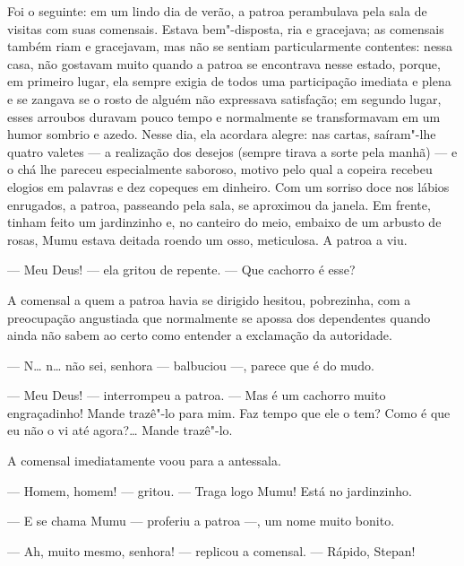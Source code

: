 Foi o seguinte: em um lindo dia de verão, a patroa perambulava pela sala
de visitas com suas comensais. Estava bem"-disposta, ria e gracejava; as
comensais também riam e gracejavam, mas não se sentiam particularmente
contentes: nessa casa, não gostavam muito quando a patroa se encontrava
nesse estado, porque, em primeiro lugar, ela sempre exigia de todos uma
participação imediata e plena e se zangava se o rosto de alguém não
expressava satisfação; em segundo lugar, esses arroubos duravam pouco
tempo e normalmente se transformavam em um humor sombrio e azedo. Nesse
dia, ela acordara alegre: nas cartas, saíram"-lhe quatro valetes --- a
realização dos desejos (sempre tirava a sorte pela manhã) --- e o chá
lhe pareceu especialmente saboroso, motivo pelo qual a copeira recebeu
elogios em palavras e dez copeques em dinheiro. Com um sorriso doce nos
lábios enrugados, a patroa, passeando pela sala, se aproximou da janela.
Em frente, tinham feito um jardinzinho e, no canteiro do meio, embaixo
de um arbusto de rosas, Mumu estava deitada roendo um osso, meticulosa.
A patroa a viu.

--- Meu Deus! --- ela gritou de repente. --- Que cachorro é esse?

A comensal a quem a patroa havia se dirigido hesitou, pobrezinha, com a
preocupação angustiada que normalmente se apossa dos dependentes quando
ainda não sabem ao certo como entender a exclamação da autoridade.

--- N\ldots{} n\ldots{} não sei, senhora --- balbuciou ---, parece que é do mudo.

--- Meu Deus! --- interrompeu a patroa. --- Mas é um cachorro muito
engraçadinho! Mande trazê"-lo para mim. Faz tempo que ele o tem? Como é
que eu não o vi até agora?\ldots{} Mande trazê"-lo.

A comensal imediatamente voou para a antessala.

--- Homem, homem! --- gritou. --- Traga logo Mumu! Está no jardinzinho.

--- E se chama Mumu --- proferiu a patroa ---, um nome muito bonito.

--- Ah, muito mesmo, senhora! --- replicou a comensal. --- Rápido,
Stepan!

